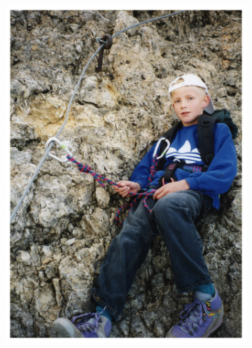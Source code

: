 \begin{frame}[standout]
\begin{figure}[h]
	\centering
	\begin{subfigure}[t]{0.49\columnwidth}
		\centering
		\includegraphics[angle=7,width=\textwidth]{include/images/1997.jpg}
	\end{subfigure}
	\hspace*{\fill}
	\begin{subfigure}[t]{0.49\columnwidth}
		\centering

\end{subfigure}
\end{figure}
\end{frame}
